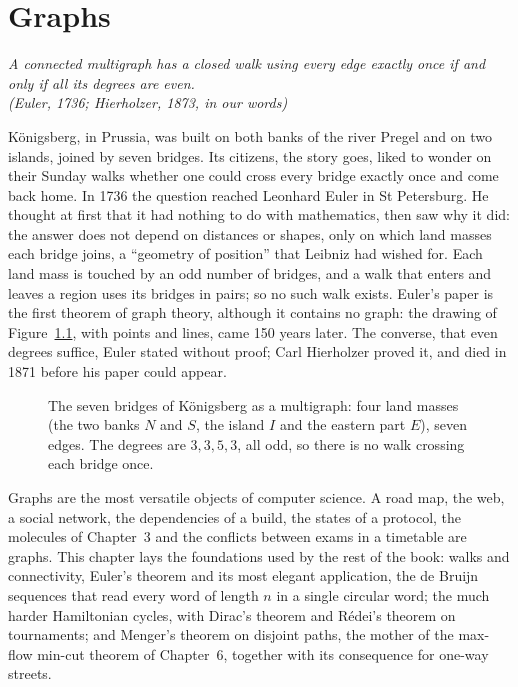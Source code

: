 \chapter{Graphs}

\begin{center}\itshape
A connected multigraph has a closed walk using every edge exactly once if and only if all its degrees are even.\\
\upshape(Euler, 1736; Hierholzer, 1873, in our words)
\end{center}

K\"onigsberg, in Prussia, was built on both banks of the river Pregel and on two islands, joined by seven bridges. Its
citizens, the story goes, liked to wonder on their Sunday walks whether one could cross every bridge exactly once and come
back home. In 1736 the question reached Leonhard Euler in St Petersburg. He thought at first that it had nothing to do with
mathematics, then saw why it did: the answer does not depend on distances or shapes, only on which land masses each bridge
joins, a ``geometry of position'' that Leibniz had wished for. Each land mass is touched by an odd number of bridges, and a
walk that enters and leaves a region uses its bridges in pairs; so no such walk exists. Euler's paper is the first theorem
of graph theory, although it contains no graph: the drawing of Figure~\ref{fig:konigsberg}, with points and lines, came
150 years later. The converse, that even degrees suffice, Euler stated without proof; Carl Hierholzer proved it, and died in
1871 before his paper could appear.

\begin{figure}[ht]
\centering
{}
\caption{The seven bridges of K\"onigsberg as a multigraph: four land masses (the two banks $N$ and $S$, the island $I$ and the
eastern part $E$), seven edges. The degrees are $3,3,5,3$, all odd, so there is no walk crossing each bridge once.}
\label{fig:konigsberg}
\end{figure}

Graphs are the most versatile objects of computer science. A road map, the web, a social network, the dependencies of a
build, the states of a protocol, the molecules of Chapter~3 and the conflicts between exams in a timetable are graphs. This
chapter lays the foundations used by the rest of the book: walks and connectivity, Euler's theorem and its most elegant
application, the de Bruijn sequences that read every word of length $n$ in a single circular word; the much harder
Hamiltonian cycles, with Dirac's theorem and R\'edei's theorem on tournaments; and Menger's theorem on disjoint paths, the
mother of the max-flow min-cut theorem of Chapter~6, together with its consequence for one-way streets.

